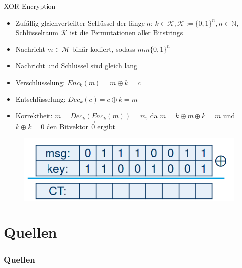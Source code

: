 \documentclass[12pt%
,aspectratio=169%
]{beamer}
\begin{document}
\begin{frame}{XOR Encryption}
\begin{itemize}
	\item Zufällig gleichverteilter Schlüssel der länge $n$: $k \in \mathcal{K}, \mathcal{K} := \{0,1\}^n, n \in \mathbb{N}$, Schlüsselraum $\mathcal{K}$ ist die Permutationen aller Bitstrings
	\item Nachricht $m \in \mathcal{M}$ binär kodiert, sodass $m in \{0,1\}^n$
	\item Nachricht und Schlüssel sind gleich lang
	\item Verschlüsselung: $Enc_k(m) = m \oplus k = c$
	\item Entschlüsselung: $Dec_k(c) = c \oplus k = m$
	\item Korrektheit: $m = Dec_k(Enc_k(m)) = m$, da $m = k \oplus m \oplus k = m$ und $k \oplus k = 0$ den Bitvektor $\vec{0}$ ergibt
\end{itemize}
\begin{figure}
\center
\includegraphics[scale=0.5]{pictures/otp}
\end{figure}
\end{frame}



\section*{Quellen}
\appendix
\begin{frame}[allowframebreaks]
  \frametitle<presentation>{Quellen}
\printbibliography
\end{frame}
\end{document}
